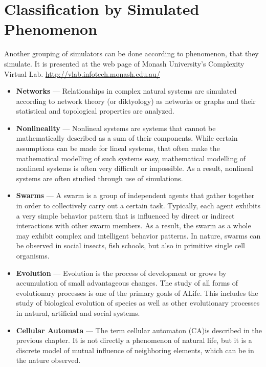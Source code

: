 \documentclass[a4paper,12pt]{report}
\begin{document}
\section{Classification by Simulated Phenomenon}
Another grouping of simulators can be done according to phenomenon, that they simulate. It is presented at the web page of Monash University’s Complexity Virtual Lab. \url{http://vlab.infotech.monash.edu.au/}
\begin{itemize}
  \item \textbf{Networks} --- Relationships in complex natural systems are simulated according to network theory (or diktyology) as networks or graphs and their statistical and topological properties are analyzed. 
  \item \textbf{Nonlineality} --- Nonlineal systems are systems that cannot be mathematically described as a sum of their components. While certain assumptions can be made for lineal systems, that often make the mathematical modelling of such systems easy, mathematical modelling of nonlineal systems is often very difficult or impossible. As a result, nonlineal systems are often studied through use of simulations.
  \item \textbf{Swarms} --- A swarm is a group of independent agents that gather together in order to collectively carry out a certain task. Typically, each agent exhibits a very simple behavior pattern that is influenced by direct or indirect interactions with other swarm members. As a result, the swarm as a whole may exhibit complex and intelligent behavior patterns. In nature, swarms can be observed in social insects, fish schools, but also in primitive single cell organisms.
  \item \textbf{Evolution} --- Evolution is the process of development or grows by accumulation of small advantageous changes. The study of all forms of evolutionary processes is one of the primary goals of ALife. This includes the study of biological evolution of species as well as other evolutionary processes in natural, artificial and social systems.
  \item \textbf{Cellular Automata} --- The term cellular automaton (CA)is described in the previous chapter. It is not directly a phenomenon of natural life, but it is a discrete model of mutual influence of neighboring elements, which can be in the nature observed. 
\end{itemize}  
\end{document}
